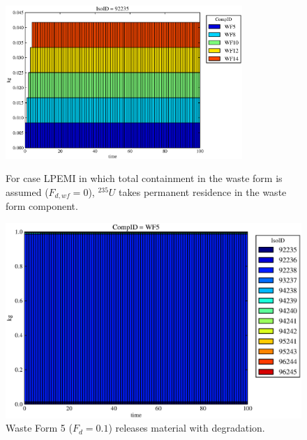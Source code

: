 



\begin{figure}[ht]
\centering
\includegraphics[width=0.8\textwidth]{./chapters/demonstration/base/lpEMI.eps}
\caption[$^{235}U$ residence. Lumped Parameter EM Waste Form No Release.]{
For case LPEMI in which total containment in the waste form is assumed 
($F_{d,wf}=0$), $^{235}U$ 
takes permanent residence in the waste form component.
}
\label{fig:lpEMIall}
\begin{minipage}[b]{0.45\linewidth}

  \includegraphics[width=\textwidth]{./chapters/demonstration/base/lpEMI1.eps}
  \caption[LPEMI Waste Form Contaminants.]{
    Waste Form 5 ($F_d = 0.1$) releases material with degradation. 
    }
  \label{fig:lpEMIwf5}
  

\end{minipage}
\end{figure}
